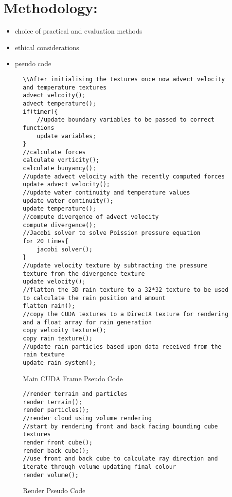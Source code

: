 \clearpage
\section{Methodology:}
\label{sec:meth}
\begin{itemize}
  \item choice of practical and evaluation methods 
  \item ethical considerations
  \item pseudo code 
\end{itemize}

\begin{figure}[h]
\centering
\begin{lstlisting}
\\After initialising the textures once now advect velocity and temperature textures
advect velcoity();
advect temperature();
if(timer){
	//update boundary variables to be passed to correct functions
	update variables;
}
//calculate forces
calculate vorticity();
calculate buoyancy();
//update advect velocity with the recently computed forces
update advect velocity();
//update water continuity and temperature values
update water continuity();
update temperature();
//compute divergence of advect velocity
compute divergence();
//Jacobi solver to solve Poission pressure equation
for 20 times{
	jacobi solver();
}
//update velocity texture by subtracting the pressure texture from the divergence texture
update velocity();
//flatten the 3D rain texture to a 32*32 texture to be used to calculate the rain position and amount
flatten rain();
//copy the CUDA textures to a DirectX texture for rendering and a float array for rain generation
copy velcoity texture();
copy rain texture();
//update rain particles based upon data received from the rain texture
update rain system();
\end{lstlisting}
\caption{Main CUDA Frame Pseudo Code}
\label{sc:UpdateCloudPseudoCode}
\end{figure}

\begin{figure}[h]
\centering
\begin{lstlisting}
//render terrain and particles
render terrain();
render particles();
//render cloud using volume rendering 
//start by rendering front and back facing bounding cube textures
render front cube();
render back cube(); 
//use front and back cube to calculate ray direction and iterate through volume updating final colour
render volume();
\end{lstlisting}
\caption{Render Pseudo Code}
\label{sc:RenderingPseudoCode}
\end{figure}


